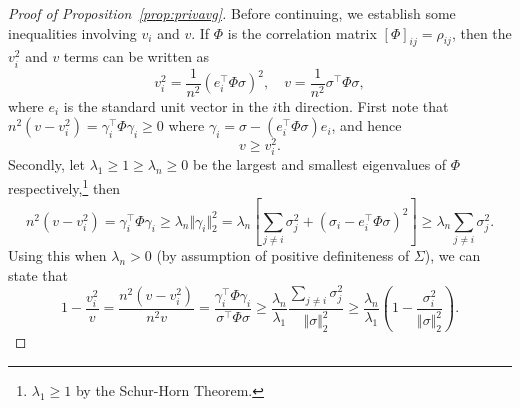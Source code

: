 \documentclass{article}
\theoremstyle{plain}
\theoremstyle{plain}
\theoremstyle{definition}
\theoremstyle{remark}
\theoremstyle{plain}
\begin{document}
\begin{proof}[Proof of Proposition~\ref{prop:privavg}]
    Before continuing, we establish some inequalities involving $v_i$ and $v$. If $\Phi$ is the correlation matrix $[\Phi]_{ij} = \rho_{ij}$, then the $v_i^2$ and $v$ terms can be written as
    \begin{equation*}
        v_i^2 = \frac{1}{n^2}(e_i^\top\Phi \sigma)^2, \quad v = \frac{1}{n^2} \sigma^\top \Phi \sigma,
    \end{equation*}
    where $e_i$ is the standard unit vector in the $i$th direction. First note that $n^2(v-v_i^2) = \gamma_i^\top\Phi\gamma_i \geq 0$ where $\gamma_i = \sigma - (e_i^\top\Phi \sigma) e_i$, and hence
    \begin{equation}\label{eq:vvi}
        v \geq v_i^2.
    \end{equation}
    Secondly, let $\lambda_1 \geq 1 \geq \lambda_n \geq 0$ be the largest and smallest eigenvalues of $\Phi$ respectively,\footnote{$\lambda_1 \geq 1$ by the Schur-Horn Theorem.} then
    \begin{equation*}
        n^2(v-v_i^2) = \gamma_i^\top\Phi\gamma_i \geq \lambda_n \Vert\gamma_i \Vert_2^2 = \lambda_n \left[\sum_{j\neq i} \sigma_j^2 + (\sigma_i - e_i^\top\Phi\sigma)^2 \right] \geq \lambda_n \sum_{j\neq i} \sigma_j^2.
    \end{equation*}
    Using this when $\lambda_n > 0$ (by assumption of positive definiteness of $\Sigma$), we can state that 
    \begin{equation}\label{eq:loginequality}
        1-\frac{v_i^2}{v} = \frac{n^2(v-v_i^2)}{n^2 v} = \frac{\gamma_i^\top\Phi\gamma_i}{\sigma^\top\Phi\sigma} \geq  \frac{\lambda_n}{\lambda_1}\frac{\sum_{j\neq i} \sigma_j^2 }{\Vert\sigma \Vert_2^2} \geq \frac{\lambda_n}{\lambda_1}\left(1- \frac{\sigma_i^2}{\Vert\sigma \Vert_2^2} \right).
    \end{equation}
    

\end{proof}
\end{document}
